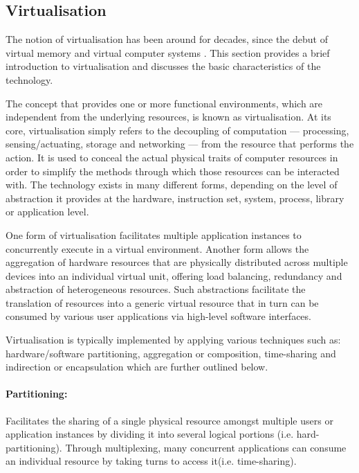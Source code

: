 \subsection{Virtualisation}
The notion of virtualisation has been around for decades, since the debut of virtual memory \cite{denning1970virtual} and virtual computer systems \cite{goldberg1973architectural}.
This section provides a brief introduction to virtualisation and discusses the basic characteristics of the technology.

The concept that provides one or more functional environments, which are independent from the underlying resources, is known as virtualisation. At its core, virtualisation simply refers to the decoupling of computation — processing, sensing/actuating, storage and networking — from the resource that performs the action. It is used to conceal the actual physical traits of computer resources in order to simplify the methods through which those resources can be interacted with. The technology exists in many different forms, depending on the level of abstraction it provides at the hardware, instruction set, system, process, library or application level. 


One form of virtualisation facilitates multiple application instances to concurrently execute in a virtual environment. Another form allows the aggregation of hardware resources that are physically distributed across multiple devices into an individual virtual unit, offering load balancing, redundancy and abstraction of heterogeneous resources. Such abstractions facilitate the translation of resources into a generic virtual resource that in turn can be consumed by various user applications via high-level software interfaces. 


Virtualisation is typically implemented by applying various techniques such as: hardware/software partitioning, aggregation or composition, time-sharing and indirection or encapsulation \cite{fortes2005guest} which are further outlined below.

\paragraph{Partitioning:} Facilitates the sharing of a single physical resource amongst multiple users or application instances by dividing it into several logical portions (i.e. hard-partitioning). Through multiplexing, many concurrent applications can consume an individual resource by taking turns to access it(i.e. time-sharing).   

